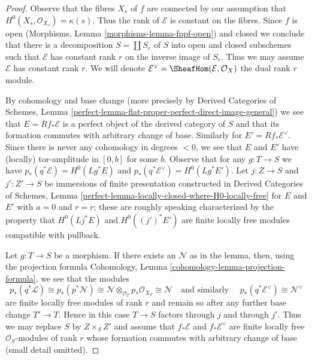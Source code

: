 \begin{proof}
Observe that the fibres $X_s$ of $f$ are connected by our assumption
that $H^0(X_s, \mathcal{O}_{X_s}) = \kappa(s)$. Thus the rank of
$\mathcal{E}$ is constant on the fibres. Since $f$ is open
(Morphisms, Lemma \ref{morphisms-lemma-fppf-open}) and closed
we conclude that there is a decomposition $S = \coprod S_r$
of $S$ into open and closed subschemes such that $\mathcal{E}$
has constant rank $r$ on the inverse image of $S_r$.
Thus we may assume $\mathcal{E}$ has constant rank $r$.
We will denote $\mathcal{E}^\vee = \SheafHom(\mathcal{E}, \mathcal{O}_X)$
the dual rank $r$ module.

\medskip\noindent
By cohomology and base change (more precisely by
Derived Categories of Schemes, Lemma
\ref{perfect-lemma-flat-proper-perfect-direct-image-general})
we see that $E = Rf_*\mathcal{E}$ is a perfect object of the
derived category of $S$ and that its formation commutes with
arbitrary change of base. Similarly for $E' = Rf_*\mathcal{E}^\vee$.
Since there is never any cohomology in degrees $< 0$, we see that
$E$ and $E'$ have (locally) tor-amplitude in $[0, b]$ for some $b$.
Observe that for any $g : T \to S$ we have
$p_*(q^*\mathcal{E}) = H^0(Lg^*E)$ and
$p_*(q^*\mathcal{E}^\vee) = H^0(Lg^*E')$.
Let $j : Z \to S$ and $j' : Z' \to S$ be immersions
of finite presentation constructed in Derived Categories of Schemes, Lemma
\ref{perfect-lemma-locally-closed-where-H0-locally-free}
for $E$ and $E'$ with $a = 0$ and $r = r$; these are roughly speaking
characterized by the property that $H^0(Lj^*E)$ and $H^0((j')^*E')$
are finite locally free modules compatible with pullback.

\medskip\noindent
Let $g : T \to S$ be a morphism. If there exists an $\mathcal{N}$
as in the lemma, then, using the projection formula
Cohomology, Lemma \ref{cohomology-lemma-projection-formula},
we see that the modules
$$
p_*(q^*\mathcal{L}) \cong
p_*(p^*\mathcal{N}) \cong
\mathcal{N} \otimes_{\mathcal{O}_T} p_*\mathcal{O}_{X_T} \cong
\mathcal{N}\quad\text{and similarly }\quad
p_*(q^*\mathcal{E}^\vee) \cong \mathcal{N}^\vee
$$
are finite locally free modules of rank $r$
and remain so after any further base change $T' \to T$.
Hence in this case $T \to S$ factors through $j$ and through $j'$.
Thus we may replace $S$ by $Z \times_S Z'$ and assume that
$f_*\mathcal{E}$ and $f_*\mathcal{E}^\vee$ are finite locally free
$\mathcal{O}_S$-modules of rank $r$
whose formation commutes with arbitrary change of base
(small detail omitted).


\end{proof}
